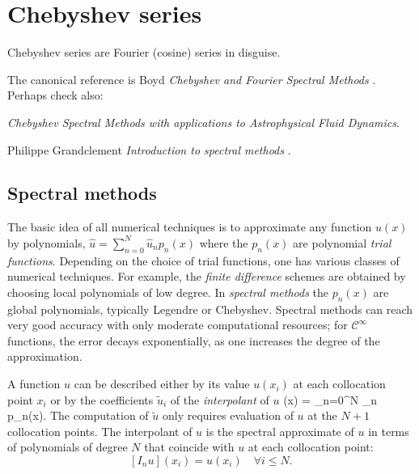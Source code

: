  \renewcommand{\Ssym}[1]{{\ensuremath{m_{#1}}}}    %

\section{Chebyshev series}
\label{sect:ChebyshevSer}

\begin{bartlett}{
Chebyshev series are Fourier (cosine) series in disguise.
        }
\end{bartlett}

The canonical reference is
Boyd {\em Chebyshev and Fourier Spectral Methods}
. Perhaps check also:

{\em Chebyshev Spectral Methods with applications to Astrophysical Fluid Dynamics}.

Philippe Grandclement {\em Introduction to spectral methods}
.

\subsection{Spectral methods}
\label{sect:SpectrMeth}
                                                            \toCB
The basic idea of all numerical techniques is to approximate any function
$u(x)$ by polynomials, $\hat{u} = \sum_{n=0}^N \hat{u}_n p_n(x)$ where the
$p_n(x)$ are polynomial {\em trial functions}. Depending on the choice of
trial functions, one has various classes of numerical techniques. For
example, the {\em finite difference} schemes are obtained by choosing
local polynomials of low degree. In \emph{spectral methods} the $p_n(x)$
are global polynomials, typically Legendre or Chebyshev. Spectral methods
can reach very good accuracy with only moderate computational resources;
for ${{\mathcal C}^\infty}$ functions, the error decays exponentially, as
one increases the degree of the approximation.

A function $u$ can be described either by its value $u(x_i)$ at each
collocation point $x_i$ or by the coefficients $\tilde{u}_i$ of the  {\em
interpolant} of $u$
\beq
[I_N u](x) = \sum_{n=0}^N _n p_n(x).
The computation of $\tilde{u}$ only requires evaluation of $u$ at the $N+1$
collocation points. The interpolant of $u$ is the spectral approximate of
$u$ in terms of polynomials of degree $N$ that coincide with $u$ at each
collocation point:
\[
[I_nu](x_i) = u(x_i) \quad \forall i\leq N.
\]

